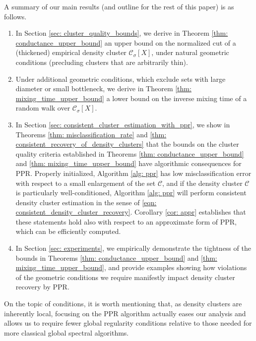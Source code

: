 \documentclass{article}
\newcommand{\1}{\mathbf{1}}
\newcommand{\Xbf}{X}             %
\newcommand{\Cset}{\mathcal{C}}
\newcommand{\Csig}{\Cset_{\sigma}}
\newcommand{\ppr}{{\sc PPR}}
\theoremstyle{aldenthm}
\theoremstyle{aldenrmrk}
\begin{document}
A summary of our main results (and outline for the rest of this paper) is as
follows.  

\begin{enumerate}
\item In Section \ref{sec: cluster_quality_bounds}, we derive in Theorem
  \ref{thm: conductance_upper_bound} an upper bound on the normalized cut of a  
  (thickened) empirical density cluster $\Csig[\Xbf]$, under natural geometric 
  conditions (precluding clusters that are arbitrarily thin).  

\item Under additional geometric conditions, which exclude sets with large diameter or small bottleneck, we derive in Theorem
  \ref{thm: mixing_time_upper_bound} a lower bound on the
  inverse mixing time of a random walk over $\Csig[\Xbf]$.
	
\item In Section \ref{sec: consistent_cluster_estimation_with_ppr}, we show in
  Theorems \ref{thm: misclassification_rate} and \ref{thm: consistent_recovery_of_density_clusters} that the bounds on the cluster quality criteria established in Theorems \ref{thm: conductance_upper_bound} and \ref{thm:
    mixing_time_upper_bound} have algorithmic consequences for \ppr. 
  Properly initialized, Algorithm \ref{alg: ppr} has low misclassification error with respect to a small enlargement of the set $\Cset$, and if the density cluster $\Cset$ is particularly well-conditioned, Algorithm \ref{alg: ppr} will perform consistent density cluster estimation in the sense of \eqref{eqn: consistent_density_cluster_recovery}. Corollary \ref{cor: appr} establishes that these statements hold also with respect to an approximate form of \ppr, which can be efficiently computed.

\item In Section \ref{sec: experiments}, we empirically
  demonstrate the tightness of the bounds in Theorems \ref{thm: conductance_upper_bound} and \ref{thm: mixing_time_upper_bound}, and provide examples showing how violations of the geometric conditions we require manifestly
  impact density cluster recovery by \ppr.  
\end{enumerate}

On the topic of conditions, it is worth mentioning that, as density clusters
are inherently local, focusing on the PPR algorithm actually eases our analysis
and allows us to require fewer global regularity conditions relative to those
needed for more classical global spectral algorithms.    
\end{document}
